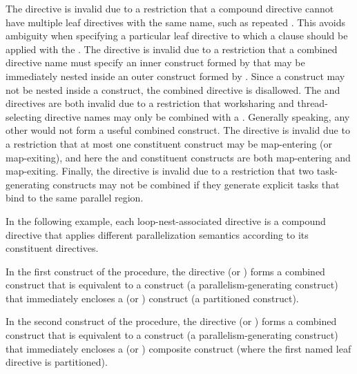 The  directive is invalid due to a restriction
that a compound directive cannot have multiple leaf directives with the same
name, such as repeated . This avoids ambiguity when specifying a
particular leaf directive to which a clause should be applied with the
. The  directive is invalid
due to a restriction that a combined directive name must specify an inner
construct formed by  that may be immediately nested
inside an outer construct formed by . Since a
 construct may not be nested inside a  construct,
the combined directive is disallowed. The  and
 directives are both invalid due to a restriction that
worksharing and thread-selecting directive names may only be combined with a
 . Generally speaking, any other
 would not form a useful combined construct. The
 directive is invalid due to a restriction
that at most one constituent construct may be map-entering (or map-exiting),
and here the  and  constituent constructs are
both map-entering and map-exiting. Finally, the  directive
is invalid due to a restriction that two task-generating constructs may not be
combined if they generate explicit tasks that bind to the same parallel region.


In the following example, each loop-nest-associated directive is a compound
directive that applies different parallelization semantics according to its
constituent directives.

In the first construct of the  procedure, the directive
 (or ) forms a combined construct that
is equivalent to a  construct (a parallelism-generating
construct) that immediately encloses a  (or ) construct
(a partitioned construct).

In the second construct of the procedure, the directive  (or ) forms a combined construct that is
equivalent to a  construct (a parallelism-generating
construct) that immediately encloses a  (or )
composite construct (where the first named leaf directive is partitioned).

